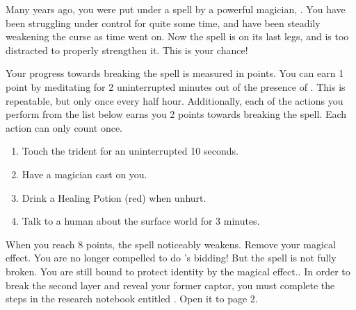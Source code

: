 \documentclass[green]{NeptuneBall}
\begin{document}
\name{\gSpellBreak{}}


Many years ago, you were put under a spell by a powerful magician, \cWitch{}. You have been struggling under \cWitch{\their} control for quite some time, and have been steadily weakening the curse as time went on. Now the spell is on its last legs, and \cWitch{} is too distracted to properly strengthen it. This is your chance!

Your progress towards breaking the spell is measured in points. You can earn 1 point by meditating for 2 uninterrupted minutes out of the presence of \cWitch{}. This is repeatable, but only once every half hour. Additionally, each of the actions you perform from the list below earns you 2 points towards breaking the spell. Each action can only count once.

\begin{enumerate}
\item Touch the trident for an uninterrupted 10 seconds.
\item Have a magician cast \aLesserDispel{} on you.
\item Drink a Healing Potion (red) when unhurt.
\item Talk to a human about the surface world for 3 minutes.
\end{enumerate}

When you reach 8 points, the spell noticeably weakens. Remove your \iEnslavementSpell{} magical effect. You are no longer compelled to do \cWitch{}'s bidding! But the spell is not fully broken. You are still bound to protect \cWitch{\their} identity by the \iIdentityProtectionSpell{} magical effect.. In order to break the second layer and reveal your former captor, you must complete the steps in the research notebook entitled \nSpellBreakNotebook{}. Open it to page 2.
\end{document}
